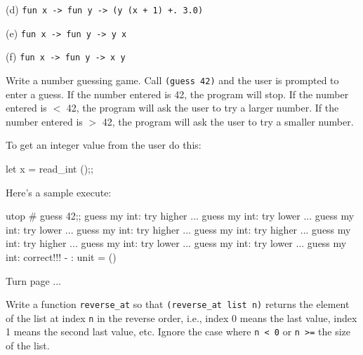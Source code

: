 (d) \verb!fun x -> fun y -> (y (x + 1) +. 3.0)!
\\
\ANSWER
\begin{answercode}

\end{answercode}

(e) \verb!fun x -> fun y -> y x!
\\
\ANSWER
\begin{answercode}

\end{answercode}

(f) \verb!fun x -> fun y -> x y!
\\
\ANSWER
\begin{answercode}

\end{answercode}

\newpage
\nextq
Write a number guessing game. Call \verb!(guess 42)!
and the user is prompted to enter a guess. If the number
entered is 42, the program will stop. If the number entered is
$<$ 42, the program will ask the user to try a larger number. If
the number entered is $>$ 42, the program will ask the user to
try a smaller number.

To get an integer value from the user do this:
\begin{console}
let x = read_int ();;
\end{console}

Here's a sample execute:
{\small
\begin{console}[commandchars=\\\{\}]
utop # guess 42;;
guess my int: 
try higher ...
guess my int: 
try lower ...
guess my int: 
try lower ...
guess my int: 
try higher ...
guess my int: 
try higher ...
guess my int: 
try higher ...
guess my int: 
try lower ...
guess my int: 
try lower ...
guess my int: 
correct!!!
- : unit = ()
\end{console}
}

Turn page ...
\newpage
\ANSWER
\begin{answercode}

\end{answercode}

\newpage
\nextq
Write a function \verb!reverse_at! so that \verb!(reverse_at list n)!
returns the element of the list at index \verb!n! in the reverse order,
i.e., index 0 means the last value, index 1 means the second last value, etc.
Ignore the case where \verb!n < 0! or \verb!n >=! the size of the list.

